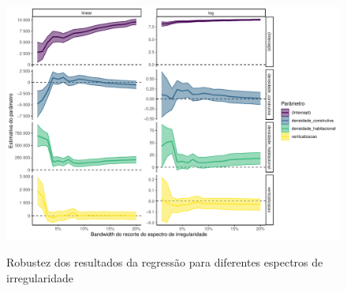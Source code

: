 \begin{apendicesenv}
\clearpage

\begin{figure}[!h]
    \centering
    \caption{Robustez dos resultados da regressão para diferentes espectros de irregularidade}
    \includegraphics[width = \linewidth]{figuras/robustez-regressao1pop.pdf}
    \label{fig:robustez-reg1}
\end{figure}

\end{apendicesenv}
    
    
